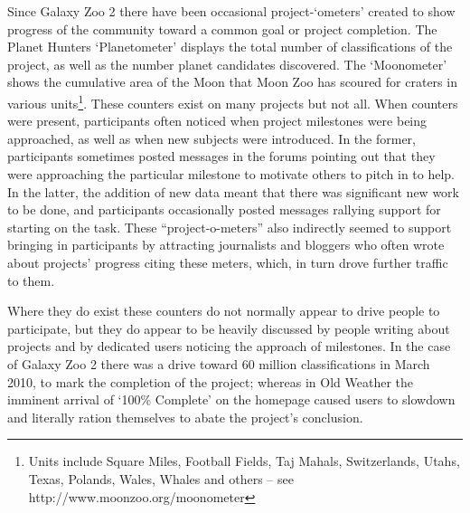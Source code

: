 \documentclass{sigchi}
\begin{document}
Since Galaxy Zoo 2 there have been occasional project-`ometers' created to show progress of the community toward a common goal or project completion. The Planet Hunters `Planetometer' displays the total number of classifications of the project, as well as the number planet candidates discovered. The `Moonometer' shows the cumulative area of the Moon that Moon Zoo has scoured for craters in various units\footnote{Units include Square Miles, Football Fields, Taj Mahals, Switzerlands, Utahs, Texas, Polands, Wales, Whales and others -- see http://www.moonzoo.org/moonometer}. These counters exist on many projects but not all. When counters were present, participants often noticed when project milestones were being approached, as well as when new subjects were introduced.  In the former, participants sometimes posted messages in the forums pointing out that they were approaching the particular milestone to motivate others to pitch in to help.  In the latter, the addition of new data meant that there was significant new work to be done, and participants occasionally posted messages rallying support for starting on the task.  These ``project-o-meters'' also indirectly seemed to support bringing in  participants by attracting journalists and bloggers who often wrote about projects' progress citing these meters, which, in turn drove further traffic to them. 



Where they do exist these counters do not normally appear to drive people to participate, but they do appear to be heavily discussed by people writing about projects and by dedicated users noticing the approach of milestones. In the case of Galaxy Zoo 2 there was a drive toward 60 million classifications in March 2010, to mark the completion of the project; whereas in Old Weather the imminent arrival of `100\% Complete' on the homepage caused users to slowdown and literally ration themselves to abate the project's conclusion.
\end{document}
